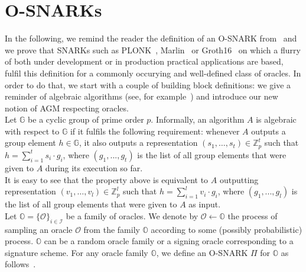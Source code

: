 \section{O-SNARKs}
\label{sec:short_snarks_defs}
In the following, we remind the reader the definition of an O-SNARK from~\cite{O_SNARK} and we prove that 
SNARKs such as PLONK~\cite{plonk}, Marlin~\cite{marlin} or Groth16~\cite{groth16} on which a flurry of 
both under development or in production practical applications are based, fulfil this definition for a commonly occurying 
and well-defined class of oracles. In order to do that, we start with a couple of building block definitions: we give a 
reminder of algebraic algorithms (see, for example~\cite{AGM_model}) and introduce our new notion of AGM respecting oracles. \\

\noindent Let $\mathbb{G}$ be a cyclic group of prime order $p$. Informally, an algorithm $A$ is algebraic with respect to $\mathbb{G}$ if it fulfils the following requirement: 
whenever $A$ outputs a group element $h \in \mathbb{G}$, it also outputs a representation $(s_1, \ldots, s_t) \in \mathbb{Z}^{t}_p$ 
such that $h = \sum_ {i =1}^t s_i \cdot g_i$, where $(g_1,...,g_t)$ is the list of all group elements that were given to $A$ during its execution so far. \\

\noindent It is easy to see that the property above is equivalent to $A$ outputting  representation $(v_1, \ldots, v_l) \in \mathbb{Z}^{l}_p$ 
such that $h = \sum_ {i =1}^l v_i \cdot g_i$, where $(g_1,...,g_l)$ is the list of all group elements that were given to $A$ as input. \\


\noindent Let $\mathbb{O} = \{ \mathcal{O} \}_{i \in \mathcal{I}}$ be a family of oracles. We denote by $\mathcal{O} \leftarrow \mathbb{O}$ 
the process of sampling an oracle $\mathcal{O}$ from the family $\mathbb{O}$ according to some (possibly probabilistic) process.
$\mathbb{O}$ can be a random oracle family or a signing oracle corresponding to a signature scheme. For any oracle family 
$\mathbb{O}$, we define an O-SNARK $\Pi$ for $\mathbb{O}$ as follows~\cite{O_SNARK}. \\

